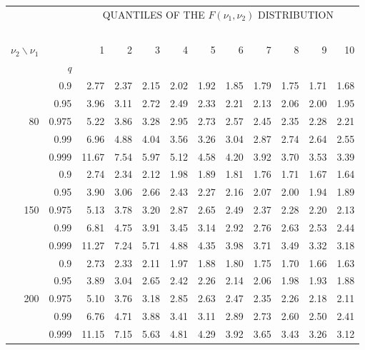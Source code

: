 \documentclass[12pt,a4paper,openany,twoside]{report}
\theoremstyle{definition}
\theoremstyle{remark}
\theoremstyle{plain}
\theoremstyle{definition}
\theoremstyle{definition}
\theoremstyle{definition}
\theoremstyle{remark}
\begin{document}
\newpage

\begin{center}
\begin{tabular}{rr@{\ \ }r@{\ \ }r@{\ \ }r@{\ \ }r@{\ \ }r@{\ \ }r@{\ \ }r@{\ \ }r@{\ \ }r@{\ \ }r@{ }}
& &\multicolumn{10}{c}{QUANTILES OF THE $F(\nu_1, \nu_2)$ DISTRIBUTION}\\
\ \\
$\nu_2\backslash\nu_1$ & & 1 & 2 & 3 & 4 & 5 & 6 & 7 & 8 & 9 & 10\\
 & \textit{q}  &  &  &  &  &  &  &  &  & & \\
\rule{0pt}{2.5ex} & 0.9 & 2.77 & 2.37 & 2.15 & 2.02 & 1.92 & 1.85 & 1.79 & 1.75 & 1.71 & 1.68\\
 & 0.95 & 3.96 & 3.11 & 2.72 & 2.49 & 2.33 & 2.21 & 2.13 & 2.06 & 2.00 & 1.95\\
80 & 0.975 & 5.22 & 3.86 & 3.28 & 2.95 & 2.73 & 2.57 & 2.45 & 2.35 & 2.28 & 2.21\\
 & 0.99 & 6.96 & 4.88 & 4.04 & 3.56 & 3.26 & 3.04 & 2.87 & 2.74 & 2.64 & 2.55\\
 & 0.999 & 11.67 & 7.54 & 5.97 & 5.12 & 4.58 & 4.20 & 3.92 & 3.70 & 3.53 & 3.39\\
\rule{0pt}{2.5ex} & 0.9 & 2.74 & 2.34 & 2.12 & 1.98 & 1.89 & 1.81 & 1.76 & 1.71 & 1.67 & 1.64\\
 & 0.95 & 3.90 & 3.06 & 2.66 & 2.43 & 2.27 & 2.16 & 2.07 & 2.00 & 1.94 & 1.89\\
150 & 0.975 & 5.13 & 3.78 & 3.20 & 2.87 & 2.65 & 2.49 & 2.37 & 2.28 & 2.20 & 2.13\\
 & 0.99 & 6.81 & 4.75 & 3.91 & 3.45 & 3.14 & 2.92 & 2.76 & 2.63 & 2.53 & 2.44\\
 & 0.999 & 11.27 & 7.24 & 5.71 & 4.88 & 4.35 & 3.98 & 3.71 & 3.49 & 3.32 & 3.18\\
\rule{0pt}{2.5ex} & 0.9 & 2.73 & 2.33 & 2.11 & 1.97 & 1.88 & 1.80 & 1.75 & 1.70 & 1.66 & 1.63\\
 & 0.95 & 3.89 & 3.04 & 2.65 & 2.42 & 2.26 & 2.14 & 2.06 & 1.98 & 1.93 & 1.88\\
200 & 0.975 & 5.10 & 3.76 & 3.18 & 2.85 & 2.63 & 2.47 & 2.35 & 2.26 & 2.18 & 2.11\\
 & 0.99 & 6.76 & 4.71 & 3.88 & 3.41 & 3.11 & 2.89 & 2.73 & 2.60 & 2.50 & 2.41\\
 & 0.999 & 11.15 & 7.15 & 5.63 & 4.81 & 4.29 & 3.92 & 3.65 & 3.43 & 3.26 & 3.12\\
\end{tabular}
\end{center}
\end{document}
